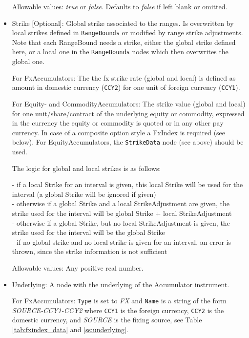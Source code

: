 \begin{itemize}
    Allowable values: \emph{true} or \emph{false}. Defaults to \emph{false} if left blank or omitted.

\item Strike [Optional]: Global strike associated to the ranges.  Is overwritten by local strikes defined in \lstinline!RangeBounds! or modified by range strike adjustments. Note that each RangeBound needs a strike, either the global strike defined here, or a local one in the \lstinline!RangeBounds! nodes which then overwrites the global one.

For FxAccumulators: The the fx strike rate (global and local) is defined as amount in domestic currency (\lstinline!CCY2!) for one unit of foreign currency (\lstinline!CCY1!). 

For Equity- and CommodityAccumulators: The strike value (global and local) for one unit/share/contract of the underlying equity or commodity, expressed in the currency the equity or commodity is quoted or in any other pay currency. In case of a composite option style a FxIndex is required (see below). For EquityAccumulators, the \lstinline!StrikeData! node (see above) should be used.

The logic for global and local strikes is as follows:

- if a local Strike for an interval is given, this local Strike will be used for the interval (a global Strike will be ignored if given)\\
- otherwise if a global Strike and a local StrikeAdjustment are given, the strike used for the interval will be global Strike + local StrikeAdjustment\\
- otherwise if a global Strike, but no local StrikeAdjustment is given, the strike used for the interval will be the global Strike\\
- if no global strike and no local strike is given for an interval, an error is thrown, since the strike information is not sufficient  

    Allowable values: Any positive real number.
    
\item Underlying: A node with the underlying of the Accumulator instrument.

For FxAccumulators: \lstinline!Type! is set to \emph{FX} and \lstinline!Name! is a string of the form \emph{SOURCE-CCY1-CCY2} where \lstinline!CCY1! is the foreign currency, \lstinline!CCY2! is the domestic currency, and \emph{SOURCE} is the fixing source, see Table \ref{tab:fxindex_data} and  \ref{ss:underlying}.


\end{itemize}
